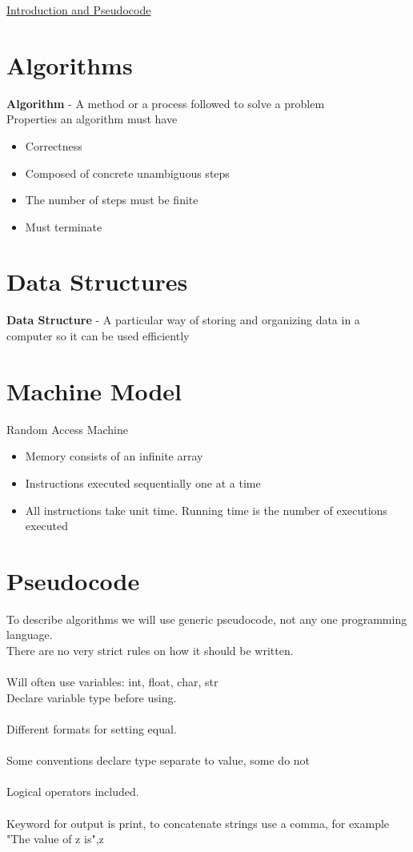 \documentclass{article}[18pt]
\begin{document}
\begin{center}
\underline{\huge Introduction and Pseudocode}
\end{center}
\section{Algorithms}
\textbf{Algorithm} - A method or a process followed to solve a problem\\
Properties an algorithm must have
\begin{itemize}
\item Correctness
\item Composed of concrete unambiguous steps
\item The number of steps must be finite
\item Must terminate
\end{itemize}
\section{Data Structures}
\textbf{Data Structure} - A particular way of storing and organizing data in a computer so it can be used efficiently
\section{Machine Model}
Random Access Machine 
\begin{itemize}
\item Memory consists of an infinite array
\item Instructions executed sequentially one at a time
\item All instructions take unit time. Running time is the number of executions executed 
\end{itemize}
\section{Pseudocode}
To describe algorithms we will use generic pseudocode, not any one programming language.\\
There are no very strict rules on how it should be written.\\
\\
Will often use variables: int, float, char, str\\
Declare variable type before using.\\
\\
Different formats for setting equal.\\
\\
Some conventions declare type separate to value, some do not\\
\\
Logical operators included.\\
\\
Keyword for output is print, to concatenate strings use a comma, for example "The value of z is",z\\
\\
\end{document}
